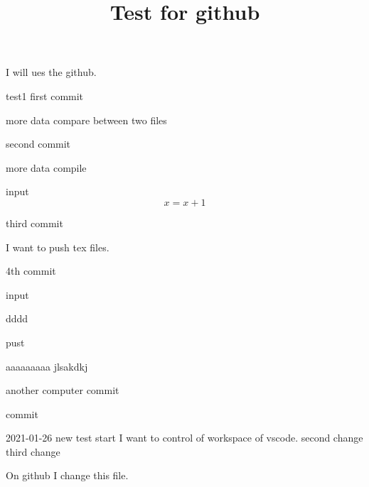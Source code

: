 \documentclass[draft]{amsart}
\title{Test for github}
\theoremstyle{remark}
\begin{document}
\maketitle
I will ues the github.

test1
first commit

more data
compare between two files

second commit

more data
compile

input
\begin{equation*}
    x= x+1
\end{equation*}



third commit

I want to push tex files.


4th commit

input


dddd


pust

aaaaaaaaa
jlsakdkj

another computer
commit


commit

2021-01-26 new test start
I want to control of workspace of vscode.
second change
third change

On github I change this file.
\end{document}
